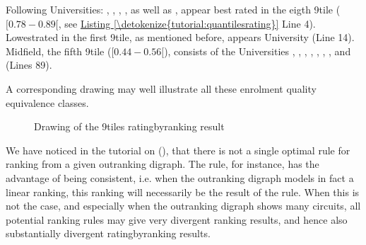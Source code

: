 \documentclass[a4paper,12pt,english]{sphinxhowto}
\let\sphinxpxdimen\pdfpxdimen\else\newdimen\sphinxpxdimen
\begin{document}
Following Universities: , , , ,  as well as  , appear best rated in the eigth 9\sphinxhyphen{}tile (\([0.78 - 0.89[\), see \hyperref[\detokenize{tutorial:quantilesrating}]{Listing \ref{\detokenize{tutorial:quantilesrating}}} Line 4). Lowest\sphinxhyphen{}rated in the first 9\sphinxhyphen{}tile, as mentioned before, appears University  (Line 14). Midfield, the fifth 9\sphinxhyphen{}tile (\([0.44 - 0.56[\)), consists of the Universities , , , , , ,  ,  and  (Lines 8\sphinxhyphen{}9).

A corresponding  drawing may well illustrate all these enrolment quality equivalence classes.

\begin{sphinxVerbatim}[commandchars=\\\{\}]
\PYGZbs{}
\end{sphinxVerbatim}

\begin{figure}[H]
\centering
\capstart

\noindent\sphinxincludegraphics[width=500\sphinxpxdimen]{{ratingResult}.png}
\caption{Drawing of the 9\sphinxhyphen{}tiles rating\sphinxhyphen{}by\sphinxhyphen{}ranking result}\label{\detokenize{tutorial:ratingresult}}\end{figure}

We have noticed in the tutorial on {\hyperref[\detokenize{tutorial:ranking-tutorial-label}]{}} (), that there is not a single optimal rule for ranking from a given outranking digraph. The  rule, for instance, has the advantage of being  consistent, i.e. when the outranking digraph models in fact a linear ranking, this ranking will necessarily be the result of the  rule. When this is not the case, and especially when the outranking digraph shows many circuits, all potential ranking rules may give very divergent ranking results, and hence also substantially divergent rating\sphinxhyphen{}by\sphinxhyphen{}ranking results.
\end{document}
